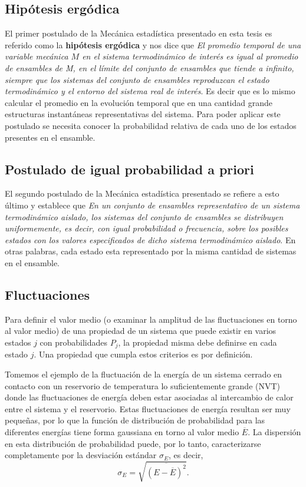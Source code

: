 \subsection{Hipótesis ergódica}

El primer postulado de la Mecánica estadística presentado en esta tesis es 
referido como la \textbf{hipótesis ergódica} y nos dice que \textit{El promedio 
temporal de una variable mecánica $M$ en el sistema termodinámico de interés es 
igual al promedio de ensambles de M, en el límite del conjunto de ensambles que 
tiende a infinito, siempre que los sistemas del conjunto de ensambles reproduzcan 
el estado termodinámico y el entorno del sistema real de interés}. Es decir que
es lo mismo calcular el promedio en la evolución temporal que en una cantidad 
grande estructuras instantáneas representativas del sistema. Para poder aplicar
este postulado se necesita conocer la probabilidad relativa de cada uno de los 
estados presentes en el ensamble.

\subsection{Postulado de igual probabilidad a priori}

El segundo postulado de la Mecánica estadística presentado se refiere a esto
último y establece que \textit{En un conjunto de ensambles representativo de un 
sistema termodinámico aislado, los sistemas del conjunto de ensambles se distribuyen 
uniformemente, es decir, con igual probabilidad o frecuencia, sobre los posibles 
estados con los valores especificados de dicho sistema termodinámico aislado}.
En otras palabras, cada estado esta representado por la misma cantidad de sistemas
en el ensamble.

\subsection{Fluctuaciones}

Para definir el valor medio (o examinar la amplitud de las fluctuaciones en torno 
al valor medio) de una propiedad de un sistema que puede existir en varios estados
$j$ con probabilidades $P_j$, la propiedad misma debe definirse en cada estado 
$j$. Una propiedad que cumpla estos criterios es  por definición.

Tomemos el ejemplo de la fluctuación de la energía de un sistema cerrado en 
contacto con un reservorio de temperatura lo suficientemente grande (NVT) donde 
las fluctuaciones de energía deben estar asociadas al intercambio de calor entre 
el sistema y el reservorio. Estas fluctuaciones de energía resultan ser muy 
pequeñas, por lo que la función de distribución de probabilidad para las 
diferentes energías tiene forma gaussiana en torno al valor medio $\overline{E}$. 
La dispersión en esta distribución de probabilidad puede, por lo tanto,
caracterizarse completamente por la desviación estándar $\sigma_E$, es decir, 
$$
\sigma_E = \sqrt{\overline{(E - \overline{E})^2}}.
$$

